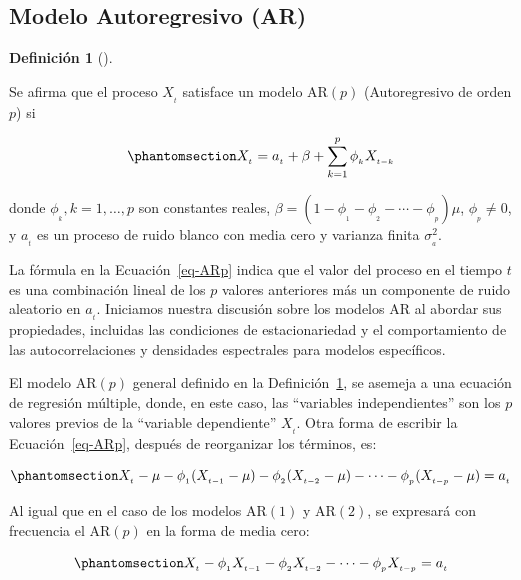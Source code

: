 \documentclass[
  us-letterpaper,
]{scrreprt}
\theoremstyle{plain}
\theoremstyle{definition}
\theoremstyle{plain}
\theoremstyle{definition}
\newtheorem{definition}{Definición}[chapter]
\theoremstyle{remark}
\begin{document}
\subsection{Modelo Autoregresivo (AR)}\label{modelo-autoregresivo-ar}

\begin{definition}[]\protect\hypertarget{def-mARp}{}\label{def-mARp}

Se afirma que el proceso \(X_{_t}\) satisface un modelo
\(\mathrm{AR}(p)\) (Autoregresivo de orden \(p\)) si

\begin{equation}\phantomsection\label{eq-ARp}{
X_{_t}=a_{_t}+\beta+\sum_{k=1}^p \phi_{_k}X_{_{t-k}}
}\end{equation}

donde \(\phi_{_k}, k=1,\ldots,p\) son constantes reales,
\(\beta = \left(1-\phi_{_1}-\phi_{_2}-\cdots-\phi_{_p}\right)\mu\),
\(\phi_{_p}\neq 0\), y \(a_{_t}\) es un proceso de ruido blanco con
media cero y varianza finita \(\sigma_{_a}^2\).

\end{definition}

La fórmula en la Ecuación~\ref{eq-ARp} indica que el valor del proceso
en el tiempo \(t\) es una combinación lineal de los \(p\) valores
anteriores más un componente de ruido aleatorio en \(a_{_t}\). Iniciamos
nuestra discusión sobre los modelos \(\mathrm{AR}\) al abordar sus
propiedades, incluidas las condiciones de estacionariedad y el
comportamiento de las autocorrelaciones y densidades espectrales para
modelos específicos.

El modelo \(\mathrm{AR}(p)\) general definido en la
Definición~\ref{def-mARp}, se asemeja a una ecuación de regresión
múltiple, donde, en este caso, las ``variables independientes'' son los
\(p\) valores previos de la ``variable dependiente'' \(X_{_t}\). Otra
forma de escribir la Ecuación~\ref{eq-ARp}, después de reorganizar los
términos, es:

\begin{equation}\phantomsection\label{eq-oarp}{
X_{_t}-\mu-\phi_{_1}(X_{_{t-1}}-\mu)-\phi_{_2}(X_{_{t-2}}-\mu)-\cdots-\phi_{_p}(X_{_{t-p}}-\mu)=a_{_t}
}\end{equation}

Al igual que en el caso de los modelos \(\mathrm{AR}(1)\) y
\(\mathrm{AR}(2)\), se expresará con frecuencia el \(\mathrm{AR}(p)\) en
la forma de media cero:

\begin{equation}\phantomsection\label{eq-m0arp}{
X_{_t} -\phi_{_1}X_{_{t-1}}-\phi_{_2}X_{_{t-2}}-\cdots-\phi_{_p}X_{_{t-p}}=a_{_t}
}\end{equation}
\end{document}
